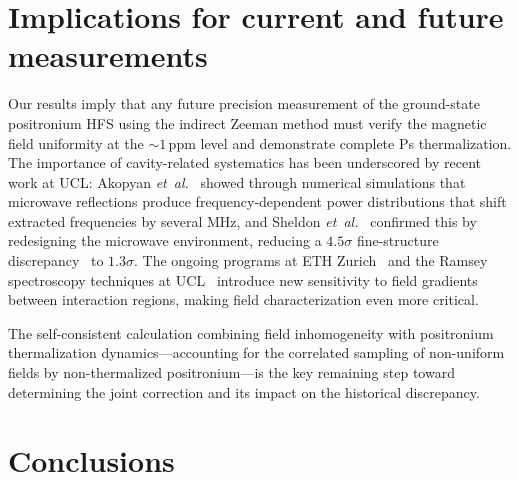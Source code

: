 \documentclass[twocolumn,pra,aps,superscriptaddress,floatfix,10pt]{revtex4-2}
\newcommand{\etal}{\textit{et~al.}}
\begin{document}
\section{Implications for current and future measurements}
\label{sec:future}

Our results imply that any future precision measurement of the ground-state positronium HFS using the indirect Zeeman method must verify the magnetic field uniformity at the $\sim 1$\,ppm level and demonstrate complete Ps thermalization. The importance of cavity-related systematics has been underscored by recent work at UCL: Akopyan \etal~\cite{Akopyan2021} showed through numerical simulations that microwave reflections produce frequency-dependent power distributions that shift extracted frequencies by several MHz, and Sheldon \etal~\cite{Sheldon2023} confirmed this by redesigning the microwave environment, reducing a $4.5\sigma$ fine-structure discrepancy~\cite{Gurung2020} to $1.3\sigma$. The ongoing programs at ETH Zurich~\cite{ThorpeWoods2026} and the Ramsey spectroscopy techniques at UCL~\cite{Newson2026} introduce new sensitivity to field gradients between interaction regions, making field characterization even more critical.

The self-consistent calculation combining field inhomogeneity with positronium thermalization dynamics---accounting for the correlated sampling of non-uniform fields by non-thermalized positronium---is the key remaining step toward determining the joint correction and its impact on the historical discrepancy.

\section{Conclusions}
\label{sec:conclusion}
\end{document}
